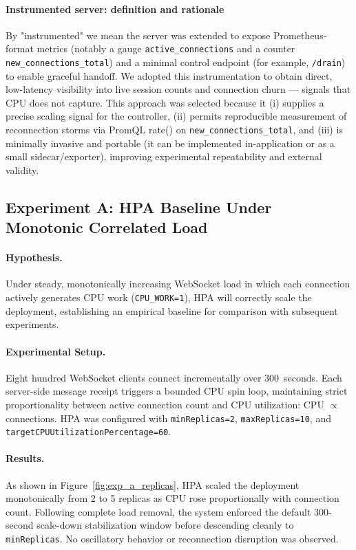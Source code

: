 \documentclass[twocolumn]{svjour3}
\begin{document}
\paragraph{Instrumented server: definition and rationale}
By "instrumented" we mean the server was extended to expose Prometheus-format metrics (notably a gauge \texttt{active\_connections} and a counter \texttt{new\_connections\_total}) and a minimal control endpoint (for example, \texttt{/drain}) to enable graceful handoff. We adopted this instrumentation to obtain direct, low-latency visibility into live session counts and connection churn — signals that CPU does not capture. This approach was selected because it (i) supplies a precise scaling signal for the controller, (ii) permits reproducible measurement of reconnection storms via PromQL rate() on \texttt{new\_connections\_total}, and (iii) is minimally invasive and portable (it can be implemented in-application or as a small sidecar/exporter), improving experimental repeatability and external validity.

\subsection{Experiment A: HPA Baseline Under Monotonic Correlated Load}

\paragraph{Hypothesis.} Under steady, monotonically increasing WebSocket load in which each connection actively generates CPU work (\texttt{CPU\_WORK=1}), HPA will correctly scale the deployment, establishing an empirical baseline for comparison with subsequent experiments.

\paragraph{Experimental Setup.} Eight hundred WebSocket clients connect incrementally over 300~seconds. Each server-side message receipt triggers a bounded CPU spin loop, maintaining strict proportionality between active connection count and CPU utilization: CPU $\propto$ connections. HPA was configured with \texttt{minReplicas=2}, \texttt{maxReplicas=10}, and \texttt{targetCPUUtilizationPercentage=60}.

\paragraph{Results.} As shown in Figure~\ref{fig:exp_a_replicas}, HPA scaled the deployment monotonically from 2 to 5 replicas as CPU rose proportionally with connection count. Following complete load removal, the system enforced the default 300-second scale-down stabilization window before descending cleanly to \texttt{minReplicas}. No oscillatory behavior or reconnection disruption was observed.
\end{document}
